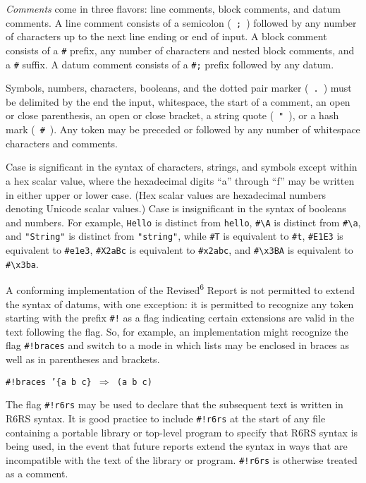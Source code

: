 \label{grammar_s5}\label{grammar_s6}\label{grammar_s7}\label{grammar_s8}\label{grammar_s9}\label{grammar_s10}\label{grammar_s11}\textit{Comments} come in three flavors:  line comments, block comments, and datum
comments.
A line comment consists of a semicolon ( \texttt{;} )
followed by any number of characters up to the next line ending or
end of input.
A block comment consists of a \texttt{\#{}\textbar{}} prefix, any number of
characters and nested block comments, and a \texttt{\textbar{}\#{}}
suffix.
A datum comment consists of a \texttt{\#{};} prefix followed by
any datum.


Symbols, numbers, characters, booleans, and the dotted pair
marker ( \texttt{.} ) must be delimited by the end the
input, whitespace, the start of a comment, an open or close
parenthesis, an open or close bracket, a string quote ( \texttt{"} ), or
a hash mark ( \texttt{\#{}} ).
Any token may be preceded or followed by any number of whitespace
characters and comments.


Case is significant in the syntax of characters, strings, and symbols
except within a hex scalar value, where the
hexadecimal digits ``a'' through ``f'' may be written in either
upper or lower case.
(Hex scalar values are hexadecimal numbers denoting Unicode scalar values.)
Case is insignificant in the syntax of booleans and numbers.
For example, \texttt{Hello} is distinct from
\texttt{hello}, \texttt{\#{}\textbackslash{}A} is distinct from \texttt{\#{}\textbackslash{}a}, and
\texttt{"String"} is distinct from \texttt{"string"}, while
\texttt{\#{}T} is equivalent to \texttt{\#{}t}, \texttt{\#{}E1E3} is equivalent to
\texttt{\#{}e1e3}, \texttt{\#{}X2aBc} is equivalent to \texttt{\#{}x2abc},
and \texttt{\#{}\textbackslash{}x3BA} is equivalent to \texttt{\#{}\textbackslash{}x3ba}.


A conforming implementation of the Revised\textsuperscript{6} Report is not permitted to
extend the syntax of datums, with one exception:  it is permitted to
recognize any token starting with the prefix \texttt{\#{}!} as a flag
indicating certain extensions are valid in the text following the flag.
So, for example, an implementation might recognize the flag
\texttt{\#{}!braces} and switch to a mode in which lists may be enclosed in
braces as well as in parentheses and brackets.


\texttt{\#{}!braces '\{a b c\} \(\Rightarrow\) (a b c)}

\label{grammar_s12}The flag \texttt{\#{}!r6rs} may be used to declare that the subsequent text is
written in R6RS syntax.
It is good practice to include \texttt{\#{}!r6rs} at the start of any file
containing a portable library or top-level program to specify that R6RS
syntax is being used, in the event that future reports extend the syntax
in ways that are incompatible with the text of the library or program.
\texttt{\#{}!r6rs} is otherwise treated as a comment.


